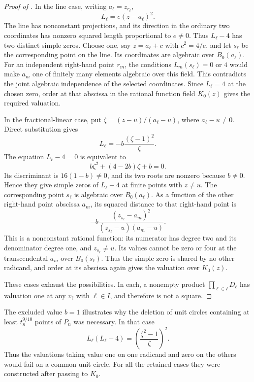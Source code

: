 \begin{proof}[Proof of ]
In the line case, writing \(a_\ell=z_{r_\ell}\),
\[
 L_\ell=e(z-a_\ell)^2.
\]
The line has nonconstant projections, and its direction in the ordinary
two coordinates has nonzero squared length proportional to \(e\ne0\).
Thus \(L_\ell-4\) has two distinct simple zeros. Choose one, say
\(z=a_\ell+c\) with \(c^2=4/e\), and let \(s_\ell\) be the
corresponding point on the line. Its coordinates are algebraic over
\(B_0(a_\ell)\). For an independent right-hand point \(r_m\), the conditions
\(L_m(s_\ell)=0\) or \(4\) would make \(a_m\) one of finitely
many elements algebraic over this field. This contradicts the joint
algebraic independence of the selected coordinates. Since \(L_\ell=4\) at the chosen zero, order at that
abscissa in the rational function field \(K_0(z)\) gives the required
valuation.

In the fractional-linear case, put
\(\zeta=(z-u)/(a_\ell-u)\), where \(a_\ell-u\ne0\). Direct
substitution gives
\begin{equation}\label{alg:fractional-distance}
 L_\ell=-b\frac{(\zeta-1)^2}{\zeta}.
\end{equation}
The equation \(L_\ell-4=0\) is equivalent to
\[
 b\zeta^2+(4-2b)\zeta+b=0.
\]
Its discriminant is \(16(1-b)\ne0\), and its two roots are nonzero
because \(b\ne0\). Hence they give simple zeros of \(L_\ell-4\)
at finite points with \(z\ne u\). The corresponding point
\(s_\ell\) is algebraic over \(B_0(a_\ell)\). As a function of
the other right-hand point abscissa \(a_m\), its squared distance to that
right-hand point is
\[
 -b\frac{(z_{s_\ell}-a_m)^2}
          {(z_{s_\ell}-u)(a_m-u)}.
\]
This is a nonconstant rational function: its numerator has degree two
and its denominator degree one, and \(z_{s_\ell}\ne u\).
Its values cannot be zero or four at the transcendental
\(a_m\) over \(B_0(s_\ell)\). Thus the simple zero is shared by
no other radicand, and order at its abscissa again gives the
valuation over \(K_0(z)\).

These cases exhaust the possibilities. In each, a nonempty product
\(\prod_{\ell\in I}D_\ell\) has valuation one at any
\(v_\ell\) with \(\ell\in I\), and therefore is not a square.
\end{proof}

The excluded value \(b=1\) illustrates why the deletion of unit circles containing at least \(t_n^{9/10}\) points of \(P_n\) was necessary. In that case
\[
 L_\ell(L_\ell-4)
   =\left(\frac{\zeta^2-1}{\zeta}\right)^2.
\]
Thus the valuations taking value one on one radicand and zero on the others would fail on a common unit circle.
For all the retained cases they were constructed after passing to
\(K_0\).
